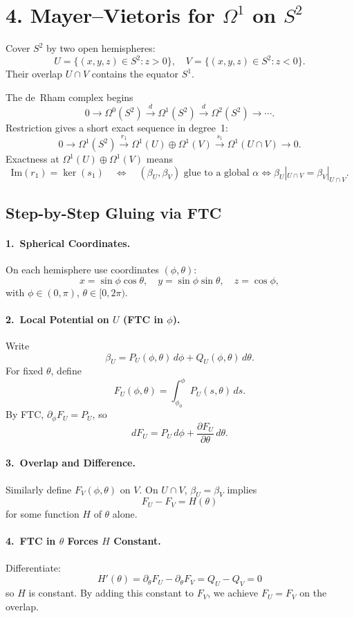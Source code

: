 \documentclass[11pt]{article}
\begin{document}
	\section{4. Mayer--Vietoris for $\Omega^1$ on $S^2$}
	Cover $S^2$ by two open hemispheres:
	\[
	U = \{(x,y,z)\in S^2 : z>0\}, \quad V = \{(x,y,z)\in S^2 : z<0\}.
	\]
	Their overlap $U\cap V$ contains the equator $S^1$.
	
	The de~Rham complex begins
	\[
	0 \longrightarrow \Omega^0(S^2) \xrightarrow{d} \Omega^1(S^2) \xrightarrow{d} \Omega^2(S^2) \longrightarrow \cdots.
	\]
	Restriction gives a short exact sequence in degree~1:
	\[
	0 \longrightarrow \Omega^1(S^2) \xrightarrow{r_1}
	\Omega^1(U)\oplus\Omega^1(V) \xrightarrow{s_1} \Omega^1(U\cap V) \longrightarrow 0.
	\]
	Exactness at $\Omega^1(U)\oplus\Omega^1(V)$ means
	\[
	\mathrm{Im}(r_1)=\ker(s_1)
	\quad\Longleftrightarrow\quad
	(\beta_U,\beta_V)\text{ glue to a global }\alpha
	\iff \beta_U|_{U\cap V}=\beta_V|_{U\cap V}.
	\]
	
	\subsection*{Step-by-Step Gluing via FTC}
	\paragraph{1.~Spherical Coordinates.}
	On each hemisphere use coordinates $(\phi,\theta)$:
	\[
	x=\sin\phi\cos\theta,\quad y=\sin\phi\sin\theta,\quad z=\cos\phi,
	\]
	with $\phi\in(0,\pi)$, $\theta\in[0,2\pi)$.
	
	\paragraph{2.~Local Potential on $U$ (FTC in $\phi$).}
	Write
	\[
	\beta_U = P_U(\phi,\theta)\,d\phi + Q_U(\phi,\theta)\,d\theta.
	\]
	For fixed $\theta$, define
	\[
	F_U(\phi,\theta)=\int_{\phi_0}^{\phi}P_U(s,\theta)\,ds.
	\]
	By FTC, $\partial_{\phi}F_U = P_U$, so
	\[
	dF_U = P_U\,d\phi + \frac{\partial F_U}{\partial \theta}\,d\theta.
	\]
	
	\paragraph{3.~Overlap and Difference.}
	Similarly define $F_V(\phi,\theta)$ on $V$.  On $U\cap V$, $\beta_U=\beta_V$ implies
	\[
	F_U-F_V=H(\theta)
	\]
	for some function $H$ of $\theta$ alone.
	
	\paragraph{4.~FTC in $\theta$ Forces $H$ Constant.}
	Differentiate:
	\[
	H'(\theta)=\partial_{\theta}F_U-\partial_{\theta}F_V=Q_U-Q_V=0
	\]
	so $H$ is constant.  By adding this constant to $F_V$, we achieve $F_U=F_V$ on the overlap.
	
\end{document}
